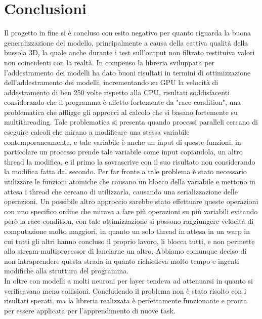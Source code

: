 \documentclass[10pt,a4paper]{article}
\begin{document}
 
\section{Conclusioni}
Il progetto in fine si è concluso con esito negativo per quanto riguarda la buona generalizzazione del modello, principalmente a causa della cattiva qualità della bussola 3D, la quale anche durante i test sull'output non filtrato restituiva valori non coincidenti con la realtà.
In compenso la libreria sviluppata per l'addestramento dei modelli ha dato buoni risultati in termini di ottimizzazione dell'addestramento dei modelli, incrementando su GPU la velocità di addestramento di ben 250 volte rispetto alla CPU, risultati soddisfacenti considerando che il programma è affetto fortemente da "race-condition", una problematica che affligge gli approcci al calcolo che si basano fortemente su multithreading.
Tale problematica si presenta quando processi paralleli cercano di eseguire calcoli che mirano a modificare una stessa variabile contemporaneamente, e tale variabile è anche un input di queste funzioni, in particolare un processo prende tale variabile come input copiandola, un altro thread la modifica, e il primo la sovrascrive con il suo risultato non considerando la modifica fatta dal secondo. Per far fronte a tale problema è stato necessario utilizzare le funzioni atomiche che causano un blocco della variabile e mettono in attesa i thread che cercano di utilizzarla, causando una serializzazione delle operazioni.
Un possibile altro approccio sarebbe stato effettuare queste operazioni con uno specifico ordine che mirava a fare più operazioni su più variabili evitando però la race-condition, con tale ottimizzazione si possono raggiungere velocità di computazione molto maggiori, in quanto un solo thread in attesa in un warp in cui tutti gli altri hanno concluso il proprio lavoro, li blocca tutti, e non permette allo stream-multiprocessor di lanciarne un altro.
Abbiamo comunque deciso di non intraprendere questa strada in quanto richiedeva molto tempo e ingenti modifiche alla struttura del programma.\\ 
In oltre con modelli a molti neuroni per layer tendeva ad attenuarsi in quanto si verificavano meno collisioni.
Concludendo il problema non è stato risolto con i risultati sperati, ma la libreria realizzata è perfettamente funzionante e pronta per essere applicata per l'apprendimento di nuove task.
\end{document}
